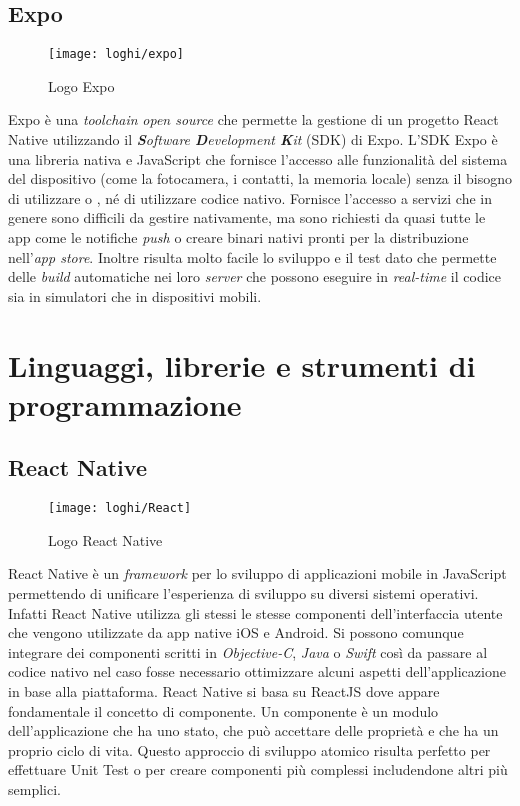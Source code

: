 \subsection{Expo} \label{subsec:expo}
	\begin{figure}[H] 
		\centering
		\texttt{[image: loghi/expo]}
		\caption{Logo Expo}
	\end{figure}
Expo è una \emph{toolchain} \emph{open source} che permette la gestione di un progetto React Native utilizzando il \emph{\textbf{S}oftware \textbf{D}evelopment \textbf{K}it} (\acrshort{SDK}) di Expo. L'SDK Expo è una libreria nativa e JavaScript 
che fornisce l'accesso alle funzionalità del sistema del dispositivo (come la 
fotocamera, i contatti, la memoria locale) senza il bisogno di utilizzare  
o , né di utilizzare codice nativo. Fornisce l'accesso a servizi 
che in genere sono difficili da gestire nativamente, ma sono richiesti da quasi 
tutte le app come le notifiche \emph{push} o creare binari nativi pronti per la 
distribuzione nell'\emph{app store}.
Inoltre risulta molto facile lo sviluppo e il test dato che permette delle 
\emph{build} automatiche nei loro \emph{server} che possono eseguire in \emph{real-time} il codice 
sia in simulatori che in dispositivi mobili.


\section{Linguaggi, librerie e strumenti di programmazione}

\subsection{React Native}
\begin{figure}[H] 
	\centering
	\texttt{[image: loghi/React]}
	\caption{Logo React Native}
\end{figure}
React Native è un \emph{framework} per lo sviluppo di applicazioni mobile in JavaScript 
permettendo di unificare l'esperienza di sviluppo su diversi sistemi operativi. 
Infatti React Native utilizza gli stessi le stesse componenti dell'interfaccia 
utente che vengono utilizzate da app native iOS e Android.
Si possono comunque integrare dei componenti scritti in \emph{Objective-C}, 
\emph{Java} o \emph{Swift} così da passare al codice nativo nel caso fosse necessario 
ottimizzare alcuni aspetti dell'applicazione in base alla piattaforma. 
React Native si basa su ReactJS dove appare fondamentale il concetto di 
componente. Un componente è un modulo dell'applicazione che ha uno stato, 
che può accettare delle proprietà e che ha un proprio ciclo di vita. 
Questo approccio di sviluppo atomico risulta perfetto per effettuare Unit Test 
o per creare componenti più complessi includendone altri più semplici.

